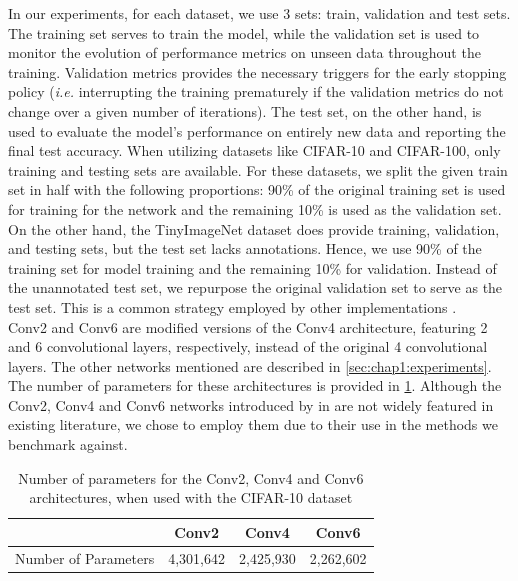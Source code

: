 In our experiments, for each dataset, we use 3 sets: train, validation and test
sets. The training set serves to train the model, while the validation set is
used to monitor the evolution of performance metrics on unseen data throughout
the training. Validation metrics provides the necessary triggers for the early
stopping policy (\emph{i.e.} interrupting the training prematurely if the
validation metrics do not change over a given number of iterations). The test
set, on the other hand, is used to evaluate the model's performance on entirely
new data and reporting the final test accuracy. When utilizing datasets like
CIFAR-10 and CIFAR-100, only training and testing sets are available. For these
datasets, we split the given train set in half with the following proportions:
90\% of the original training set is used for training for the network and the
remaining 10\% is used as the validation set. On the other hand, the
TinyImageNet dataset does provide training, validation, and testing sets, but
the test set lacks annotations. Hence, we use 90\% of the training set for model
training and the remaining 10\% for validation. Instead of the unannotated test
set, we repurpose the original validation set to serve as the test set. This is
a common strategy employed by other implementations
\cite{hanyuanxu2018tinyimagenet,nbdt,alvinwan2020nbdt}.\\


Conv2 and Conv6 are modified versions of the Conv4 architecture, featuring 2 and
6 convolutional layers, respectively, instead of the original 4 convolutional
layers. The other networks mentioned are described in
\cref{sec:chap1:experiments}. The number of parameters for these architectures
is provided in \cref{tab:chap2:conv_num_params}. Although the Conv2, Conv4 and
Conv6 networks introduced by \citeauthor{DBLP:conf/iclr/FrankleC19} in
\cite{DBLP:conf/iclr/FrankleC19} are not widely featured in existing literature,
we chose to employ them due to their use in the methods we benchmark against.

\begin{table}[ht!]
  \centering\begin{tabular}{lccc}
    \cmidrule[\heavyrulewidth]{2-4}
                         & \textbf{Conv2} & \textbf{Conv4} & \textbf{Conv6} \\ \toprule
    Number of Parameters & 4,301,642      & 2,425,930      & 2,262,602      \\ \bottomrule
  \end{tabular}
  \caption{Number of parameters for the Conv2, Conv4 and Conv6 architectures, when used with the CIFAR-10 dataset}
  \label{tab:chap2:conv_num_params}
\end{table}

